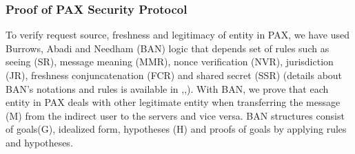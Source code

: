 \documentclass[journal,article,submit,moreauthors,pdftex]{Definitions/mdpi}
\begin{document}
\subsubsection{Proof of PAX Security Protocol}
To verify request source, freshness and legitimacy of entity in PAX, we have used Burrows, Abadi and Needham (BAN) logic that depends set of rules such as seeing (SR), message meaning (MMR), nonce verification (NVR), jurisdiction (JR),  freshness conjuncatenation (FCR) and shared secret (SSR) (details about BAN’s notations and rules is available in \cite{fp42},\cite{fp43},\cite{fp44}). With BAN, we prove that each entity in PAX deals with other legitimate entity when transferring the message (M) from the indirect user to the servers and vice versa. BAN structures consist of goals(G), idealized form, hypotheses (H) and proofs of goals by applying rules and hypotheses.
\end{document}
